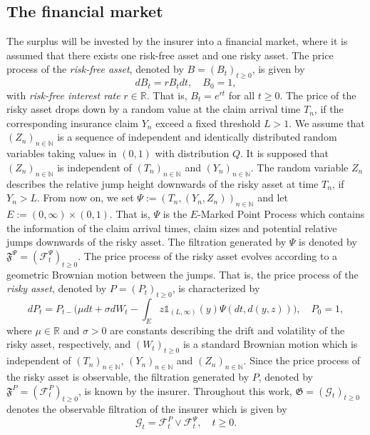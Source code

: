 \documentclass[reqno, 11pt]{amsart}%
\newcommand{\R}{\mathbb{R}}
\newcommand{\N}{\mathbb{N}}
\newcommand{\seq}[1]{(#1_n)_{n\in\N}}
\newcommand{\stpr}[1]{(#1_t)_{t\ge0}}
\theoremstyle{definition}
\numberwithin{equation}{section} \numberwithin{theorem}{section}
\begin{document}
\subsection{The financial market} 
The surplus will be invested by the insurer into a financial market, where it is assumed that there exists one risk-free asset and one risky asset. The price process of the \emph{risk-free asset}, denoted by $B=(B_t)_{t\ge0}$, is given by
\begin{equation*}
d B_t = rB_t dt, \quad B_0=1,
\end{equation*}
with \emph{risk-free interest rate}  $r\in\R$. That is, $B_t = e^{rt}$ for all $t\ge0$.
The price of the risky asset drops down by a random value at the claim arrival time $T_n$, if the corresponding insurance claim $Y_n$ exceed a fixed threshold $L>1$. 
We assume that $(Z_n)_{n\in\N}$ is a sequence of independent and identically distributed random variables taking values in $(0,1)$ with distribution $Q$. 
It is supposed that $(Z_n)_{n\in\N}$ is independent of $(T_n)_{n\in\N}$ and $(Y_n)_{n\in\N}$.
The random variable $Z_n$ describes the relative jump height downwards of the risky asset at time $T_n$, if $Y_n>L$. From now on, we set $\Psi := (T_n,(Y_n,Z_n))_{n\in\N}$ and let $E:=(0,\infty)\times(0,1)$. That is, $\Psi$ is the $E$-Marked Point Process which contains the information of the claim arrival times, claim sizes and potential relative jumps downwards of the risky asset. The filtration generated by $\Psi$ is denoted by $\mathfrak{F}^\Psi=(\mathcal{F}_t^\Psi)_{t\ge0}$.
The price process of the risky asset evolves according to a geometric Brownian motion between the jumps. That is, the price process of the \emph{risky asset}, denoted by  $P=(P_t)_{t\ge0}$, is characterized by
\begin{equation*}
d P_t = P_{t-}\bigg(\mu dt + \sigma d W_t - \int_E z \mathds{1}_{(L,\infty)}(y)\Psi(dt,d(y,z))\bigg) , \quad P_0=1,
\end{equation*}
where $\mu\in\R$ and $\sigma>0$ are constants describing the drift and volatility of the risky asset, respectively, and $(W_t)_{t\ge0}$ is a standard Brownian motion which is independent of $\seq{T}$, $\seq{Y}$ and $\seq{Z}$. Since the price process of the risky asset is observable, the filtration generated by $P$, denoted by $\mathfrak{F}^P=(\mathcal{F}_t^P)_{t\ge0}$, is known by the insurer. 
Throughout this work, ${\mathfrak G}=(\mathcal{G}_t)_{t\ge0}$ denotes the observable filtration of the insurer which is given by
\begin{equation*}
{\mathcal G}_t = {\mathcal F}^P_t\vee{\mathcal F}_t^\Psi,\quad t\ge0.
\end{equation*}
\end{document}
